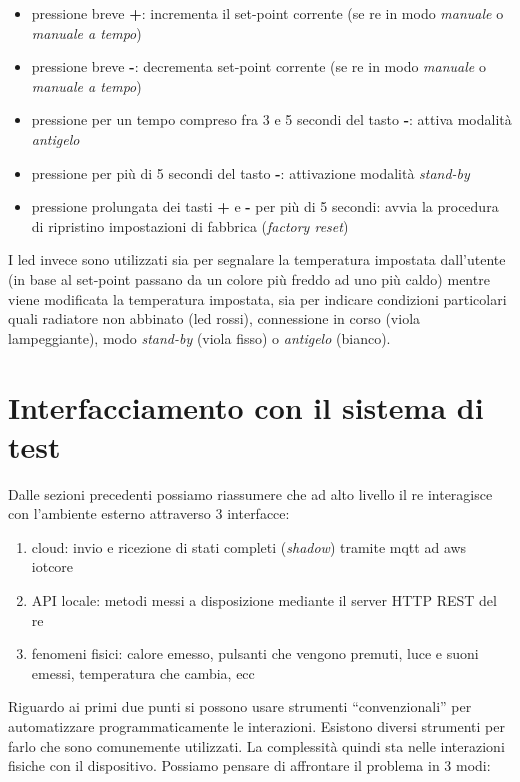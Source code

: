 \documentclass[12pt,a4paper,twoside,titlepage]{book}
\begin{document}
\begin{itemize}
    \item pressione breve \textbf{+}: incrementa il set-point corrente (se \acrshort{re} in modo \textit{manuale} o \textit{manuale a tempo})
    \item pressione breve \textbf{-}: decrementa set-point corrente (se \acrshort{re} in modo \textit{manuale} o \textit{manuale a tempo})
    \item pressione per un tempo compreso fra 3 e 5 secondi del tasto \textbf{-}: attiva modalità \textit{antigelo}
    \item pressione per più di 5 secondi del tasto \textbf{-}: attivazione modalità \textit{stand-by}
    \item pressione prolungata dei tasti \textbf{+} e \textbf{-} per più di 5 secondi: avvia la procedura di ripristino impostazioni 
        di fabbrica (\textit{factory reset})
\end{itemize}

I \acrshort{led} invece sono utilizzati sia per segnalare la temperatura impostata dall'utente
(in base al set-point passano da un colore più freddo ad uno più caldo) mentre viene modificata la 
temperatura impostata, sia per indicare condizioni particolari quali radiatore non abbinato (\acrshort{led} rossi), connessione
in corso (viola lampeggiante), modo \textit{stand-by} (viola fisso) o \textit{antigelo} (bianco).

\section{Interfacciamento con il sistema di test}

Dalle sezioni precedenti possiamo riassumere che ad alto livello il \acrshort{re} interagisce con 
l'ambiente esterno attraverso 3 interfacce:

\begin{enumerate}
    \item \gls{cloud}: invio e ricezione di stati completi (\textit{shadow}) tramite \Gls{mqtt} ad \acrshort{aws} \Gls{iotcore}
    \item API locale: metodi messi a disposizione mediante il server HTTP REST del \acrshort{re}
    \item fenomeni fisici: calore emesso, pulsanti che vengono premuti, luce e suoni emessi, temperatura che cambia, ecc
\end{enumerate}

Riguardo ai primi due punti si possono usare strumenti ``convenzionali'' per automatizzare programmaticamente
le interazioni. Esistono diversi strumenti per farlo che sono comunemente utilizzati. 
La complessità quindi sta nelle interazioni fisiche con il dispositivo. Possiamo pensare di affrontare il problema in 3 modi:
\end{document}
